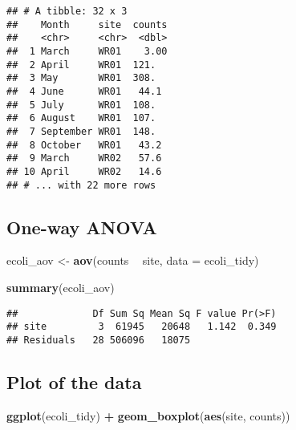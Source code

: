 \documentclass[]{book}
\newenvironment{Shaded}{\begin{snugshade}}{\end{snugshade}}
\newcommand{\DataTypeTok}[1]{\textcolor[rgb]{0.13,0.29,0.53}{#1}}
\newcommand{\KeywordTok}[1]{\textcolor[rgb]{0.13,0.29,0.53}{\textbf{#1}}}
\newcommand{\NormalTok}[1]{#1}
\newcommand{\OperatorTok}[1]{\textcolor[rgb]{0.81,0.36,0.00}{\textbf{#1}}}
\newcommand{\StringTok}[1]{\textcolor[rgb]{0.31,0.60,0.02}{#1}}
\theoremstyle{definition}
\theoremstyle{definition}
\theoremstyle{definition}
\theoremstyle{remark}
\begin{document}
\begin{Shaded}
\end{Shaded}

\begin{verbatim}
## # A tibble: 32 x 3
##    Month     site  counts
##    <chr>     <chr>  <dbl>
##  1 March     WR01    3.00
##  2 April     WR01  121.  
##  3 May       WR01  308.  
##  4 June      WR01   44.1 
##  5 July      WR01  108.  
##  6 August    WR01  107.  
##  7 September WR01  148.  
##  8 October   WR01   43.2 
##  9 March     WR02   57.6 
## 10 April     WR02   14.6 
## # ... with 22 more rows
\end{verbatim}

\hypertarget{one-way-anova}{%
\subsection{One-way ANOVA}\label{one-way-anova}}

\begin{Shaded}
\begin{Highlighting}[]
\NormalTok{ecoli_aov <-}\StringTok{ }\KeywordTok{aov}\NormalTok{(counts }\OperatorTok{~}\StringTok{ }\NormalTok{site, }\DataTypeTok{data =}\NormalTok{ ecoli_tidy)}

\KeywordTok{summary}\NormalTok{(ecoli_aov)}
\end{Highlighting}
\end{Shaded}

\begin{verbatim}
##             Df Sum Sq Mean Sq F value Pr(>F)
## site         3  61945   20648   1.142  0.349
## Residuals   28 506096   18075
\end{verbatim}

\hypertarget{plot-of-the-data-1}{%
\subsection{Plot of the data}\label{plot-of-the-data-1}}

\begin{Shaded}
\begin{Highlighting}[]
\KeywordTok{ggplot}\NormalTok{(ecoli_tidy) }\OperatorTok{+}
\StringTok{  }\KeywordTok{geom_boxplot}\NormalTok{(}\KeywordTok{aes}\NormalTok{(site, counts))}
\end{Highlighting}
\end{Shaded}
\end{document}

